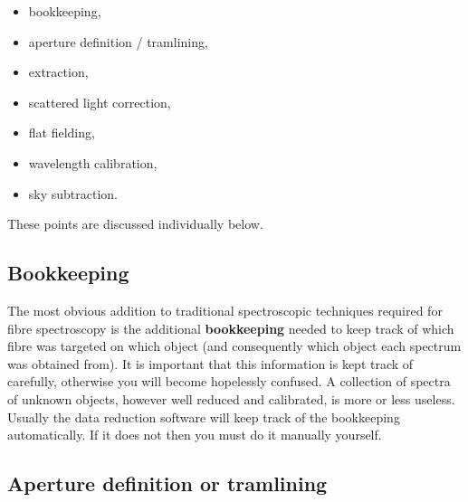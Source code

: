 \documentclass[twoside,11pt]{article}
\begin{document}
\begin{itemize}

  \item bookkeeping,

  \item aperture definition / tramlining,

  \item extraction,

  \item scattered light correction,

  \item flat fielding,

  \item wavelength calibration,

  \item sky subtraction.

\end{itemize}

These points are discussed individually below.

\subsection{Bookkeeping}

The most obvious addition to traditional spectroscopic techniques
required for fibre spectroscopy is the additional {\bf bookkeeping}
needed to keep track of which fibre was targeted on which object (and
consequently which object each spectrum was obtained from).  It is
important that this information is kept track of carefully, otherwise
you will become hopelessly confused.  A collection of spectra of
unknown objects, however well reduced and calibrated, is more or less
useless.  Usually the data reduction software will keep track of the
bookkeeping automatically.  If it does not then you must do it manually
yourself.

\subsection{Aperture definition or tramlining}
\end{document}
